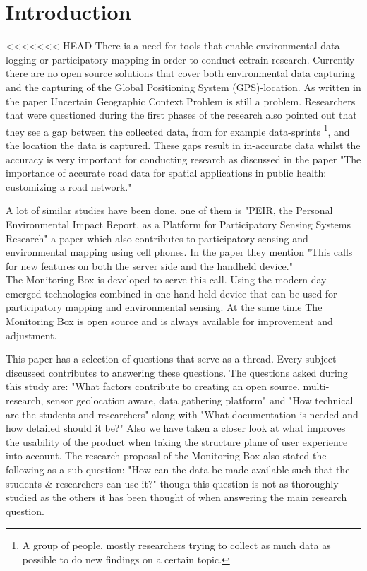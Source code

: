 \documentclass[conference]{IEEEtran}
\begin{document}
\IEEEpeerreviewmaketitle
\section{Introduction}
<<<<<<< HEAD
There is a need for tools that enable environmental data logging or participatory mapping in order to conduct cetrain research. Currently there are no open source solutions that cover both environmental data capturing and the capturing of the Global Positioning System (GPS)-location. As written in the paper Uncertain Geographic Context Problem \cite{kwan2012uncertain} is still a problem. Researchers that were questioned during the first phases of the research also pointed out that they see a gap  between the collected data, from for example data-sprints \footnote{A group of people, mostly researchers trying to collect as much data as possible to do new findings on a certain topic.}, and the location the data is captured. These gaps result in in-accurate data whilst the accuracy is very important for conducting research as discussed in the paper "The importance of accurate road data for spatial applications in public health: customizing a road network." \cite{frizzelle2009importance}

\par
A lot of similar studies have been done, one of them is "PEIR, the Personal Environmental Impact Report, as a Platform for Participatory Sensing Systems Research"
 \cite{mun2009peir} a paper which also contributes to participatory sensing and environmental mapping using cell phones. In the paper they mention "This calls for new
features on both the server side and the handheld device."  \cite{mun2009peir} \\
The Monitoring Box is developed to serve this call. Using the modern day emerged technologies combined in one hand-held device that can be used for participatory mapping and environmental sensing. At the same time The Monitoring Box is open source and is always available for improvement and adjustment.  

\par
This paper has a selection of questions that serve as a thread. Every subject discussed contributes to answering these questions. The questions asked during this study are: "What factors contribute to creating an open source, multi-research, sensor geolocation aware, data gathering platform"  \cite{monitoringBox2017researchproposal} and "How technical are the students and researchers" along with "What documentation is needed and how detailed should it be?" Also we have taken a closer look at what improves the usability of the product when taking the structure plane of user experience into account. \cite{monitoringBox2017researchproposal} The research proposal of the Monitoring Box also stated the following as a sub-question: "How can the data be made available such that the students \& researchers can use it?" \cite{monitoringBox2017researchproposal} though this question is not as thoroughly studied as the others it has been thought of when answering the main research question.  
\end{document}
